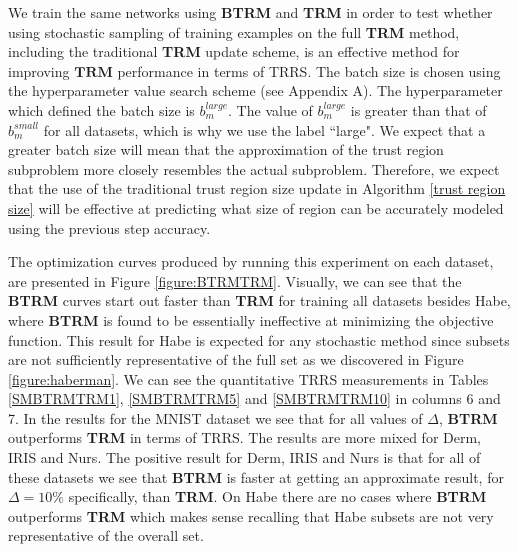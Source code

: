 \documentclass[letterpaper,12pt,titlepage,oneside,final]{book}
\begin{document}
	We train the same networks using \textbf{BTRM} and \textbf{TRM} in order to test whether using stochastic sampling of training examples on the full \textbf{TRM} method, including the traditional \textbf{TRM} update scheme, is an effective method for improving $\mathbf{TRM}$ performance in terms of TRRS. The batch size is chosen using the hyperparameter value search scheme (see Appendix A). The hyperparameter which defined the batch size is $b_{m}^{large}$. The value of $b_{m}^{large}$ is greater than that of $b_{m}^{small}$ for all datasets, which is why we use the label ``large". We expect that a greater batch size will mean that the approximation of the trust region subproblem more closely resembles the actual subproblem. Therefore, we expect that the use of the traditional trust region size update in Algorithm \ref{trust region size} will be effective at predicting what size of region can be accurately modeled using the previous step accuracy.
	
	The optimization curves produced by running this experiment on each dataset, are presented in Figure \ref{figure:BTRMTRM}. Visually, we can see that the \textbf{BTRM} curves start out faster than \textbf{TRM} for training all datasets besides Habe, where \textbf{BTRM} is found to be essentially ineffective at minimizing the objective function. This result for Habe is expected for any stochastic method since subsets are not sufficiently representative of the full set as we discovered in Figure \ref{figure:haberman}. We can see the quantitative TRRS measurements in Tables \ref{SMBTRMTRM1}, \ref{SMBTRMTRM5} and \ref{SMBTRMTRM10} in columns 6 and 7. In the results for the MNIST dataset we see that for all values of $\Delta$, \textbf{BTRM} outperforms \textbf{TRM} in terms of TRRS. The results are more mixed for Derm, IRIS and Nurs. The positive result for Derm, IRIS and Nurs is that for all of these datasets we see that \textbf{BTRM} is faster at getting an approximate result, for $\Delta=10\%$ specifically, than \textbf{TRM}. On Habe there are no cases where \textbf{BTRM} outperforms \textbf{TRM} which makes sense recalling that Habe subsets are not very representative of the overall set.  
\end{document}
